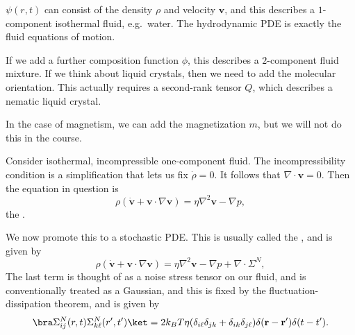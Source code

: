\documentclass[a4paper]{article}
\begin{document}
\begin{center}
\end{center}
\begin{eg}
  $\psi(r, t)$ can consist of the density $\rho$ and velocity $\mathbf{v}$, and this describes a $1$-component isothermal fluid, e.g.\ water. The hydrodynamic PDE is exactly the fluid equations of motion.

  If we add a further composition function $\phi$, this describes a $2$-component fluid mixture. If we think about liquid crystals, then we need to add the molecular orientation. This actually requires a second-rank tensor $Q$, which describes a nematic liquid crystal.

  In the case of magnetism, we can add the magnetization $m$, but we will not do this in the course.
\end{eg}

\begin{eg}
  Consider isothermal, incompressible one-component fluid. The incompressibility condition is a simplification that lets us fix $\dot{\rho} = 0$. It follows that $\nabla \cdot \mathbf{v} = 0$. Then the equation in question is
  \[
    \rho (\dot{\mathbf{v}} + \mathbf{v} \cdot \nabla \mathbf{v}) = \eta \nabla^2 \mathbf{v} - \nabla p,
  \]
  the .

  We now promote this to a stochastic PDE. This is usually called the , and is given by
  \[
    \rho (\dot{\mathbf{v}} + \mathbf{v} \cdot \nabla \mathbf{v}) = \eta \nabla^2 \mathbf{v} - \nabla p + \nabla \cdot \Sigma^N,
  \]
  The last term is thought of as a noise stress tensor on our fluid, and is conventionally treated as a Gaussian, and this is fixed by the fluctuation-dissipation theorem, and is given by
  \[
    \bra \Sigma_{ij}^N(r, t) \Sigma_{k \ell}^N (r', t')\ket = 2k_B T \eta (\delta_{i\ell} \delta_{jk} + \delta_{ik} \delta_{j\ell}) \delta(\mathbf{r} - \mathbf{r}') \delta(t - t').
  \]
\end{eg}
\end{document}
